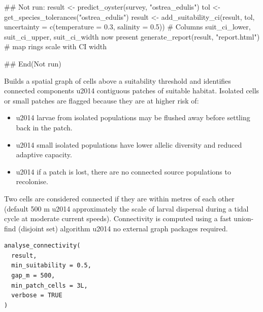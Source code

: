 \documentclass[a4paper]{book}
\begin{document}
%
\begin{Examples}
\begin{ExampleCode}
## Not run: 
result <- predict_oyster(survey, "ostrea_edulis")
tol    <- get_species_tolerances("ostrea_edulis")
result <- add_suitability_ci(result, tol,
                             uncertainty = c(temperature = 0.3,
                                             salinity    = 0.5))
# Columns suit_ci_lower, suit_ci_upper, suit_ci_width now present
generate_report(result, "report.html")   # map rings scale with CI width

## End(Not run)
\end{ExampleCode}
\end{Examples}
%
\begin{Description}
Builds a spatial graph of cells above a suitability threshold and identifies
connected components \bsl{}u2014 contiguous patches of suitable habitat. Isolated
cells or small patches are flagged because they are at higher risk of:
\begin{itemize}

\item{}  \bsl{}u2014 larvae from isolated populations may be
flushed away before settling back in the patch.
\item{}  \bsl{}u2014 small isolated populations have lower allelic
diversity and reduced adaptive capacity.
\item{}  \bsl{}u2014 if a patch is lost, there
are no connected source populations to recolonise.

\end{itemize}


Two cells are considered connected if they are within  metres of
each other (default 500 m \bsl{}u2014 approximately the scale of larval dispersal
during a tidal cycle at moderate current speeds). Connectivity is computed
using a fast union-find (disjoint set) algorithm \bsl{}u2014 no external graph
packages required.
\end{Description}
%
\begin{Usage}
\begin{verbatim}
analyse_connectivity(
  result,
  min_suitability = 0.5,
  gap_m = 500,
  min_patch_cells = 3L,
  verbose = TRUE
)
\end{verbatim}
\end{Usage}
\end{document}
